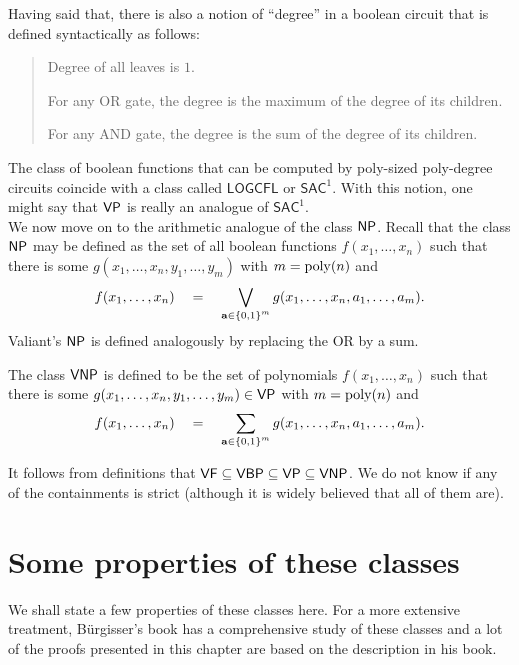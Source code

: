 Having said that, there is also a notion of ``degree'' in a boolean circuit that is defined syntactically as follows:
 \begin{quote}
   Degree of all leaves is $1$. 

   For any OR gate, the degree is the maximum of the degree of its children. 

   For any AND gate, the degree is the sum of the degree of its children. 
 \end{quote}
The class of boolean functions that can be computed by poly-sized poly-degree circuits coincide with a class called $\mathsf{LOGCFL}$ or $\mathsf{SAC}^1$. 
With this notion, one might say that $\mathsf{VP}$ is really an analogue of $\mathsf{SAC}^1$.\\


We now move on to the arithmetic analogue of the class $\NP$. 
Recall that the class $\NP$ may be defined as the set of all boolean functions $f(x_1,\dots, x_n)$ such that there is some $g(x_1,\dots, x_n, y_1,\dots, y_m)$ with $m = \operatorname{poly}(n)$ and 
\[
f(x_1,\dots, x_n)\quad = \quad \bigvee_{\mathbf{a} \in \left\{0,1\right\}^m}  g(x_1,\dots, x_n, a_1,\dots, a_m).
\]
Valiant's $\NP$ is defined analogously by replacing the OR by a sum. 

\begin{definition}[Valiant's $\NP$]\label{defn:vnp}
The class $\mathsf{VNP}$ is defined to be the set of polynomials $f(x_1,\dots, x_n)$ such that there is some $g(x_1,\dots, x_n, y_1,\dots, y_m) \in \mathsf{VP}$ with $m = \operatorname{poly}(n)$ and
\[
f(x_1,\dots, x_n)\quad = \quad \sum_{\mathbf{a} \in \left\{0,1\right\}^m}  g(x_1,\dots, x_n, a_1,\dots, a_m).
\]
\end{definition}

It follows from definitions that $\mathsf{VF} \subseteq \mathsf{VBP} \subseteq \mathsf{VP} \subseteq \mathsf{VNP}$. 
We do not know if any of the containments is strict (although it is widely believed that all of them are). 


\section{Some properties of these classes}

We shall state a few properties of these classes here. 
For a more extensive treatment, B\"{u}rgisser's book \cite{bur00} has a comprehensive study of these classes and a lot of the proofs presented in this chapter are based on the description in his book. \\

